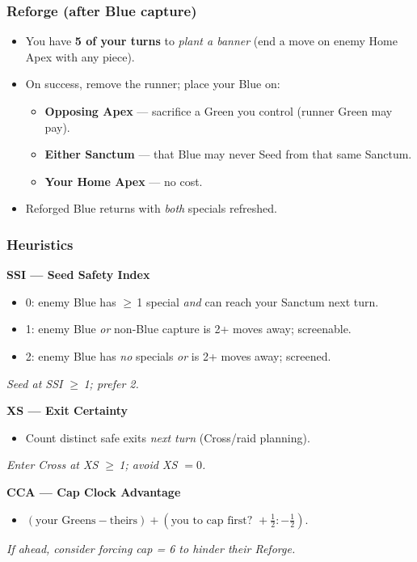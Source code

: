 \documentclass[11pt]{article}
\begin{document}
\begin{multicols}{2}
\subsubsection*{Reforge (after Blue capture)}
\begin{itemize}[leftmargin=1.1em,itemsep=0.2em]
  \item You have \textbf{5 of your turns} to \emph{plant a banner} (end a move on enemy Home Apex with any piece).
  \item On success, remove the runner; place your Blue on:
  \begin{itemize}[leftmargin=1.1em,itemsep=0.15em]
    \item \textbf{Opposing Apex} — sacrifice a Green you control (runner Green may pay).
    \item \textbf{Either Sanctum} — that Blue may never Seed from that same Sanctum.
    \item \textbf{Your Home Apex} — no cost.
  \end{itemize}
  \item Reforged Blue returns with \emph{both} specials refreshed.
\end{itemize}

\subsubsection*{Heuristics}
\textbf{SSI — Seed Safety Index}
\begin{itemize}[leftmargin=1.1em,itemsep=0.15em]
  \item 0: enemy Blue has $\geq$\,1 special \emph{and} can reach your Sanctum next turn.
  \item 1: enemy Blue \emph{or} non-Blue capture is 2+ moves away; screenable.
  \item 2: enemy Blue has \emph{no} specials \emph{or} is 2+ moves away; screened.
\end{itemize}
\emph{Seed at SSI $\geq$\,1; prefer 2.}

\textbf{XS — Exit Certainty}
\begin{itemize}[leftmargin=1.1em,itemsep=0.15em]
  \item Count distinct safe exits \emph{next turn} (Cross/raid planning).
\end{itemize}
\emph{Enter Cross at XS $\geq$\,1; avoid XS $=0$.}

\textbf{CCA — Cap Clock Advantage}
\begin{itemize}[leftmargin=1.1em,itemsep=0.15em]
  \item $(\text{your Greens} - \text{theirs}) + (\text{you to cap first? } +\tfrac12 : -\tfrac12)$.
\end{itemize}
\emph{If ahead, consider forcing cap = 6 to hinder their Reforge.}
\end{multicols}
\end{document}
